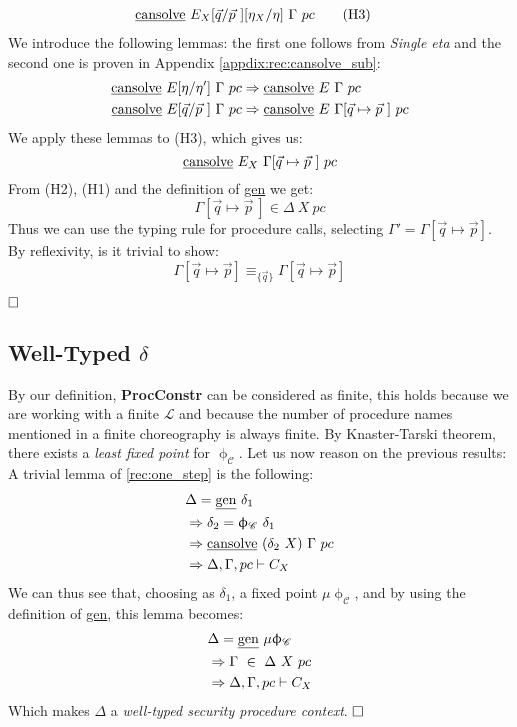 \documentclass[12pt,a4paper,twoside]{book}
\newcommand{\MCL}{\mathscr{L}}
\newcommand{\qed}{\hfill\square}
\begin{document}
\begin{itemize}
\begin{align*}
	&\text{\underline{cansolve}}~E_X[\vec{q}/\vec{p}~][\eta_X/\eta]~\Gamma~pc\tag{H3}
\end{align*}
We introduce the following lemmas: the first one follows from \emph{Single eta} and the second one is proven in Appendix \ref{appdix:rec:cansolve_sub}:
\begin{align*}
\text{\underline{cansolve}}~E[\eta/\eta']~\Gamma~pc
&\Rightarrow \text{\underline{cansolve}}~E~\Gamma~pc\\
\text{\underline{cansolve}}~E[\vec{q}/\vec{p}~]~\Gamma~pc
&\Rightarrow \text{\underline{cansolve}}~E~\Gamma[\vec{q}\mapsto\vec{p}~]~pc
\end{align*}
We apply these lemmas to (H3), which gives us:
$$
\text{\underline{cansolve}}~E_X~\Gamma[\vec{q}\mapsto\vec{p}~]~pc
$$
From (H2), (H1) and the definition of \underline{gen} we get:
$$
\Gamma[\vec{q}\mapsto\vec{p}~] \in \Delta~X~pc
$$
Thus we can use the typing rule for procedure calls, selecting $\Gamma' = \Gamma[\vec{q}\mapsto\vec{p}]$. By reflexivity, is it trivial to show:
$$
\Gamma[\vec{q}\mapsto\vec{p}] \equiv_{\{\vec{q}\}} 
\Gamma[\vec{q}\mapsto\vec{p}]
$$
\end{itemize}
$\qed$
\subsection{Well-Typed $\delta$}
By our definition, \textbf{ProcConstr} can be considered as finite, this holds because we are working with a finite $\MCL$ and because the number of procedure names mentioned in a finite choreography is always finite.
By Knaster-Tarski theorem\cite{tarski1955lattice}, there exists a \emph{least fixed point} for $\upphi_\mathscr{C}$. Let us now reason on the previous results:\\
A trivial lemma of \ref{rec:one_step} is the following:
\begin{align*}
&\Delta = \text{\underline{gen}}~\delta_1\\
&\Rightarrow \delta_2 = \upphi_\mathscr{C}~\delta_1\\
&\Rightarrow \text{\underline{cansolve}}~(\delta_2~X)~\Gamma~pc\\
&\Rightarrow \Delta,\Gamma,pc \vdash C_X
\end{align*}
We can thus see that, choosing as $\delta_1$, a fixed point $\mu\upphi_\mathscr{C}$, and by using the definition of \underline{gen}, this lemma becomes:
\begin{align*}
&\Delta = \text{\underline{gen}}~\mu\upphi_\mathscr{C}\\
&\Rightarrow \Gamma~\in~\Delta~X~pc\\
&\Rightarrow \Delta,\Gamma,pc \vdash C_X
\end{align*}
Which makes $\Delta$ a \emph{well-typed security procedure context}. $\qed$
\end{document}
